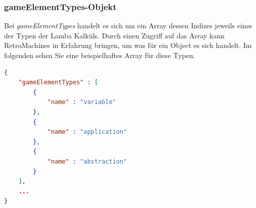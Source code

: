 \documentclass[11pt,a4paper]{report}
\begin{document}
\begin{minipage}{1\textwidth}

\subsubsection{gameElementTypes-Objekt}

Bei \textit{gameElementTypes} handelt es sich um ein Array dessen Indizes jeweils eines der Typen der Lamba Kalküls. Durch einen Zugriff auf das Array kann RetroMachines in Erfahrung bringen, um was für ein Object es sich handelt. Im folgenden sehen Sie eine beispielhaftes Array für diese Typen.

\begin{lstlisting}[language=json, firstnumber=1]
{
	"gameElementTypes" : [
        {
            "name" : "variable"
        },
        {
            "name" : "application"
        },
        {
            "name" : "abstraction"
        }
    ],
	...
}
\end{lstlisting}

\end{minipage}
\end{document}
